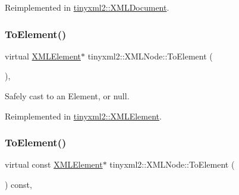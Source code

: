 Reimplemented in \mbox{\hyperlink{classtinyxml2_1_1_x_m_l_document_a747ab173887d969fe313b4617f968e99}{tinyxml2\+::\+X\+M\+L\+Document}}.

\mbox{\label{classtinyxml2_1_1_x_m_l_node_aab516e699567f75cc9ab2ef2eee501e8}} 
\subsubsection{\texorpdfstring{To\+Element()}{ToElement()}\hspace{0.1cm}{\footnotesize\ttfamily [1/2]}}
{\footnotesize\ttfamily virtual \mbox{\hyperlink{classtinyxml2_1_1_x_m_l_element}{X\+M\+L\+Element}}$\ast$ tinyxml2\+::\+X\+M\+L\+Node\+::\+To\+Element (\begin{DoxyParamCaption}{ }\end{DoxyParamCaption})\hspace{0.3cm}{\ttfamily [inline]}, {\ttfamily [virtual]}}



Safely cast to an Element, or null. 



Reimplemented in \mbox{\hyperlink{classtinyxml2_1_1_x_m_l_element_ad9ff5c2dbc15df36cf664ce1b0ea0a5d}{tinyxml2\+::\+X\+M\+L\+Element}}.

\mbox{\label{classtinyxml2_1_1_x_m_l_node_a2c5c843b8f37306f15994ebe882b9346}} 
\subsubsection{\texorpdfstring{To\+Element()}{ToElement()}\hspace{0.1cm}{\footnotesize\ttfamily [2/2]}}
{\footnotesize\ttfamily virtual const \mbox{\hyperlink{classtinyxml2_1_1_x_m_l_element}{X\+M\+L\+Element}}$\ast$ tinyxml2\+::\+X\+M\+L\+Node\+::\+To\+Element (\begin{DoxyParamCaption}{ }\end{DoxyParamCaption}) const\hspace{0.3cm}{\ttfamily [inline]}, {\ttfamily [virtual]}}



